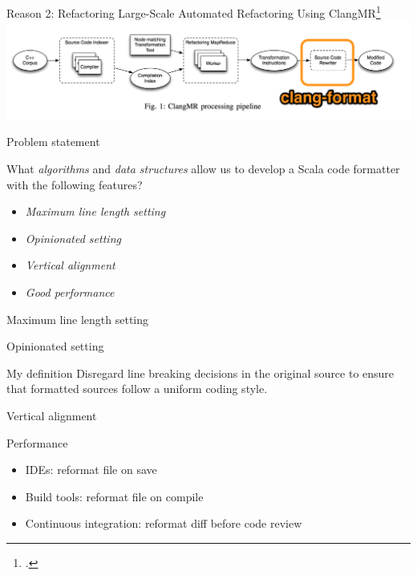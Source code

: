 \documentclass[xcolor=dvipsnames]{beamer}
\theoremstyle{definition}
\begin{document}
\begin{frame}{Reason 2: Refactoring}
  Large-Scale Automated Refactoring Using ClangMR\footcite{wright_large-scale_2013}
  \includegraphics[width=\textwidth]{img/clangmr.png}
\end{frame}

\begin{frame}{Problem statement}
  \begin{block}{}
    What \emph{algorithms} and \emph{data structures} allow us to develop a
    Scala code formatter with the following features?
    \begin{itemize}
      \item \emph{Maximum line length setting}
      \item \emph{Opinionated setting}
      \item \emph{Vertical alignment}
      \item \emph{Good performance}
    \end{itemize}
  \end{block}
\end{frame}

\begin{frame}{Maximum line length setting}
  
\end{frame}

\begin{frame}{Opinionated setting}
  \begin{block}{My definition}
    Disregard line breaking decisions in the original source to ensure that
    formatted sources follow a uniform coding style.
  \end{block}
  
\end{frame}

\begin{frame}{Vertical alignment}
  
\end{frame}

\begin{frame}{Performance}
  \begin{itemize}
    \item IDEs: reformat file on save
    \item Build tools: reformat file on compile
    \item Continuous integration: reformat diff before code review
  \end{itemize}
\end{frame}
\end{document}
